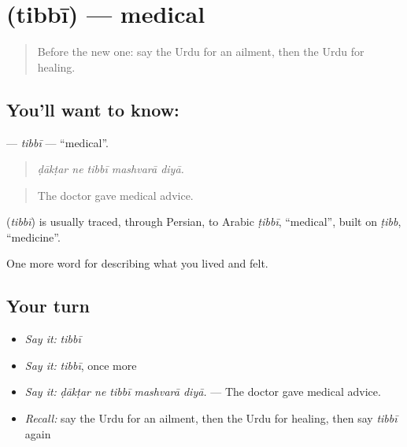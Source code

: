 \section[\texorpdfstring{\ur{طبی} (tibbī)}{طبی (tibbī)}]{ (tibbī) — medical}

\label{lesson:UR-C471-tibbi}



\begin{quote}
Before the new one: say the Urdu for an ailment, then the Urdu for healing.
\end{quote}

\subsection*{You'll want to know: }
\textbf{} — \emph{tibbī} — \textquotedblleft{}medical\textquotedblright{}.

\begin{quote}
    
\end{quote}

\begin{quote}
\emph{ḍākṭar ne tibbī mashvarā diyā.}
\end{quote}

\begin{quote}
The doctor gave medical advice.
\end{quote}

\begin{cousinweb}
\textbf{} (\emph{tibbī}) is usually traced, through Persian, to Arabic \emph{ṭibbī}, \textquotedblleft{}medical\textquotedblright{}, built on \emph{ṭibb}, \textquotedblleft{}medicine\textquotedblright{}.
\end{cousinweb}

\begin{grammarlens}[title={What you've built}]
One more word for describing what you lived and felt.
\end{grammarlens}

\subsection*{Your turn}
\begin{itemize}
\raggedright
  \item \emph{Say it:} \emph{tibbī}
  \item \emph{Say it:} \emph{tibbī}, once more
  \item \emph{Say it:} \emph{ḍākṭar ne tibbī mashvarā diyā.} — The doctor gave medical advice.
  \item \emph{Recall:} say the Urdu for an ailment, then the Urdu for healing, then say \emph{tibbī} again
\end{itemize}

